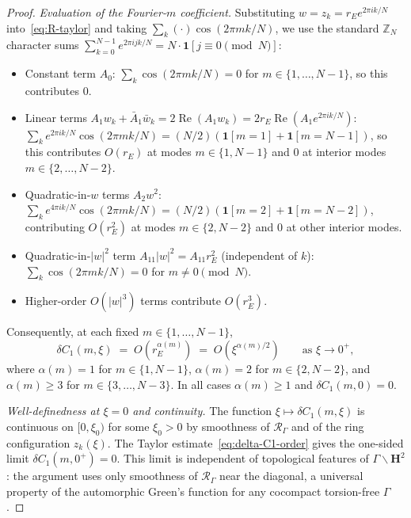 \begin{proof}
\emph{Evaluation of the Fourier-$m$ coefficient.}
Substituting $w = z_k = r_E e^{2\pi ik/N}$ into~\eqref{eq:R-taylor}
and taking $\sum_k (\cdot) \cos(2\pi m k/N)$, we use the
standard $\mathbb{Z}_N$ character sums
$\sum_{k=0}^{N-1} e^{2\pi i j k/N} = N \cdot \mathbf{1}[j \equiv 0
\!\!\pmod N]$:
\begin{itemize}[leftmargin=*,topsep=0pt,itemsep=0pt]
\item Constant term $A_0$: $\sum_k \cos(2\pi mk/N) = 0$
  for $m \in \{1, \ldots, N{-}1\}$, so this contributes $0$.
\item Linear terms $A_1 w_k + \bar A_1 \bar w_k = 2\operatorname{Re}(A_1 w_k)
  = 2 r_E \operatorname{Re}(A_1 e^{2\pi i k/N})$:
  $\sum_k e^{2\pi i k/N} \cos(2\pi m k/N)
  = (N/2)(\mathbf{1}[m = 1] + \mathbf{1}[m = N{-}1])$,
  so this contributes $O(r_E)$ at modes $m \in \{1, N{-}1\}$ and
  $0$ at interior modes $m \in \{2, \ldots, N{-}2\}$.
\item Quadratic-in-$w$ terms $A_2 w^2$:
  $\sum_k e^{4\pi i k/N}\cos(2\pi mk/N)
  = (N/2)(\mathbf{1}[m = 2] + \mathbf{1}[m = N{-}2])$,
  contributing $O(r_E^2)$ at modes $m \in \{2, N{-}2\}$
  and $0$ at other interior modes.
\item Quadratic-in-$|w|^2$ term $A_{11} |w|^2 = A_{11} r_E^2$
  (independent of $k$): $\sum_k \cos(2\pi m k/N) = 0$ for
  $m \ne 0 \pmod N$.
\item Higher-order $O(|w|^3)$ terms contribute $O(r_E^3)$.
\end{itemize}
Consequently, at each fixed $m \in \{1, \ldots, N{-}1\}$,
\begin{equation}\label{eq:delta-C1-order}
  \delta C_1(m, \xi)
  \;=\; O(r_E^{\alpha(m)})
  \;=\; O(\xi^{\alpha(m)/2})
  \qquad \text{as } \xi \to 0^+,
\end{equation}
where $\alpha(m) = 1$ for $m \in \{1, N{-}1\}$, $\alpha(m) = 2$
for $m \in \{2, N{-}2\}$, and $\alpha(m) \ge 3$ for
$m \in \{3, \ldots, N{-}3\}$.  In all cases $\alpha(m) \ge 1$
and $\delta C_1(m, 0) = 0$.

\emph{Well-definedness at $\xi = 0$ and continuity.}
The function $\xi \mapsto \delta C_1(m, \xi)$ is continuous on
$[0, \xi_0)$ for some $\xi_0 > 0$ by smoothness of
$\mathcal{R}_\Gamma$ and of the ring configuration $z_k(\xi)$.
The Taylor estimate~\eqref{eq:delta-C1-order} gives the
one-sided limit $\delta C_1(m, 0^+) = 0$.  This limit is
independent of topological features of $\Gamma\backslash
\mathbf{H}^2$: the argument uses only smoothness of
$\mathcal{R}_\Gamma$ near the diagonal, a universal property
of the automorphic Green's function for any cocompact
torsion-free $\Gamma$.
\end{proof}

